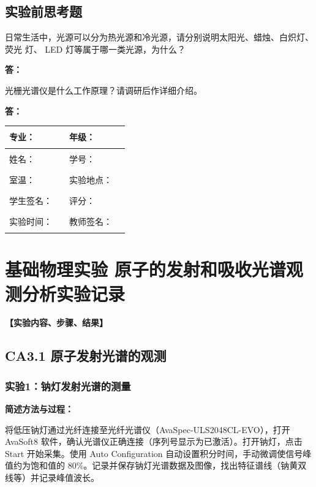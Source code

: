 \documentclass[dvipsnames, svgnames,a4paper,11pt]{article}
\newcommand{\answerblank}[1][3.8cm]{%
  \par\nopagebreak[4]\noindent\textbf{答：}\par\nopagebreak[4]\vspace*{#1}}
\begin{document}
\subsection{实验前思考题}
\begin{question}
	日常生活中，光源可以分为热光源和冷光源，请分别说明太阳光、蜡烛、白炽灯、荧光
	灯、 LED 灯等属于哪一类光源，为什么？
\end{question}
\answerblank[3.8cm]
\begin{question}
	光栅光谱仪是什么工作原理？请调研后作详细介绍。
\end{question}
\answerblank[3.8cm]
\clearpage
\begin{table}
	\renewcommand\arraystretch{1.7}
	\centering
	\begin{tabularx}{\textwidth}{|X|X|X|X|}
	\hline
	专业：& \rule{2.5cm}{0.4pt} &年级：& \rule{2.5cm}{0.4pt} \\
	\hline
	姓名： & \rule{2.5cm}{0.4pt} & 学号：& \rule{3cm}{0.4pt}\\
	\hline
	室温：& \rule{2.5cm}{0.4pt} & 实验地点： & \rule{2.5cm}{0.4pt} \\
	\hline
	学生签名：&\rule{2.5cm}{0.4pt}& 评分： &\\
	\hline
	实验时间：& \rule{3cm}{0.4pt} & 教师签名：& \rule{3cm}{0.4pt} \\
	\hline
	\end{tabularx}
\end{table}

\section{基础物理实验  \quad 原子的发射和吸收光谱观测分析\heiti 实验记录}


\textbf{【实验内容、步骤、结果】}

\subsection{CA3.1 原子发射光谱的观测}

\subsubsection{实验1：钠灯发射光谱的测量}

\textbf{简述方法与过程：}

将低压钠灯通过光纤连接至光纤光谱仪（AvaSpec-ULS2048CL-EVO），打开 AvaSoft8 软件，确认光谱仪正确连接（序列号显示为已激活）。打开钠灯，点击 Start 开始采集。使用 Auto Configuration 自动设置积分时间，手动微调使信号峰值约为饱和值的 80\%。记录并保存钠灯光谱数据及图像，找出特征谱线（钠黄双线等）并记录峰值波长。
\end{document}
